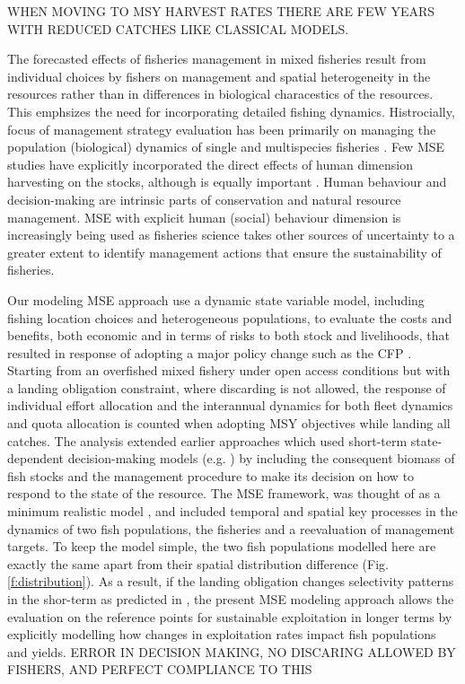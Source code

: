 \documentclass[12pt,oneline,a4paper,numbib]{ouparticle}
\numberwithin{equation}{subsection} %
\begin{document}
WHEN MOVING TO MSY HARVEST RATES THERE ARE FEW YEARS WITH REDUCED CATCHES LIKE CLASSICAL MODELS.

The forecasted effects of fisheries management in mixed fisheries result from individual choices by fishers on management and spatial heterogeneity in the resources rather than in differences in biological characestics of the resources. This emphsizes the need for incorporating detailed fishing dynamics. Histrocially, focus of management strategy evaluation has been primarily on managing the population (biological) dynamics of single and multispecies fisheries \cite{Butterworth1997, DelaMare1996, Dichmont2006, Punt1992, Punt1999, Punt2002, Smith1999}. Few MSE studies have explicitly incorporated the direct effects of human dimension harvesting on the stocks, although is equally important \cite{Fulton2011, Hilborn1985}. Human behaviour and decision-making are intrinsic parts of conservation and natural resource management. MSE with explicit human (social) behaviour dimension is increasingly being used \cite{Andersen2010, Ono2017} as fisheries science takes other sources of uncertainty to a greater extent to identify management actions that ensure the sustainability of fisheries. 

Our modeling MSE approach use a dynamic state variable model, including fishing location choices and heterogeneous populations, to evaluate the costs and benefits, both economic and in terms of risks to both stock and livelihoods, that resulted in response of adopting a major policy change such as the CFP \cite{CFP2013}. Starting from an overfished mixed fishery under open access conditions but with a landing obligation constraint, where discarding is not allowed, the response of individual effort allocation and the interannual dynamics for both fleet dynamics and quota allocation is counted when adopting MSY objectives while landing all catches. The analysis extended earlier approaches which used short-term state-dependent decision-making models (e.g. \cite{Alzorriz2018, Batsleer2016, Poos2010}) by including the consequent biomass of fish stocks and the management procedure to make its decision on how to respond to the state of the resource. The MSE framework, was thought of as a minimum realistic model \cite{Kell2007, Punt1995}, and included temporal and spatial key processes in the dynamics of two fish populations, the fisheries and a reevaluation of management targets. To keep the model simple, the two fish populations modelled here are exactly the same apart from their spatial distribution difference (Fig. \ref{f:distribution}). As a result, if the landing obligation changes selectivity patterns in the shor-term as predicted in \cite{Alzorriz2018, Batsleer2016}, the present MSE modeling approach allows the evaluation on the reference points for sustainable exploitation in longer terms by explicitly modelling how changes in exploitation rates impact fish populations and yields. ERROR IN DECISION MAKING, NO DISCARING ALLOWED BY FISHERS, AND PERFECT COMPLIANCE TO THIS
\end{document}
